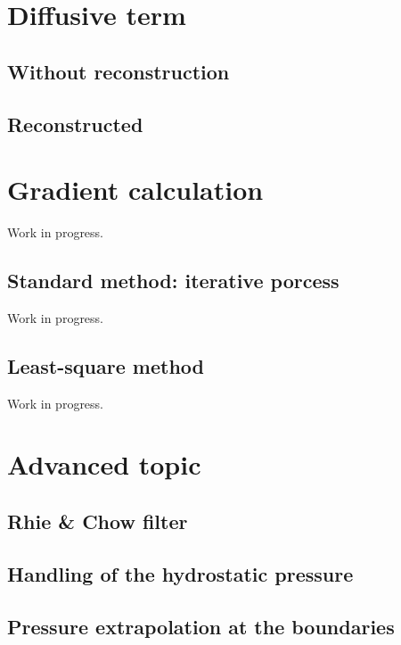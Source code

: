 \section{Diffusive term}

\subsection{Without reconstruction}

\subsection{Reconstructed}



\section{Gradient calculation}

Work in progress.

\subsection{Standard method: iterative porcess}\label{sec:space_discretization_it_grad}
Work in progress.

\subsection{Least-square method}
Work in progress.


\section{Advanced topic}

\subsection{Rhie \& Chow filter}


\subsection{Handling of the hydrostatic pressure}

\subsection{Pressure extrapolation at the boundaries}


